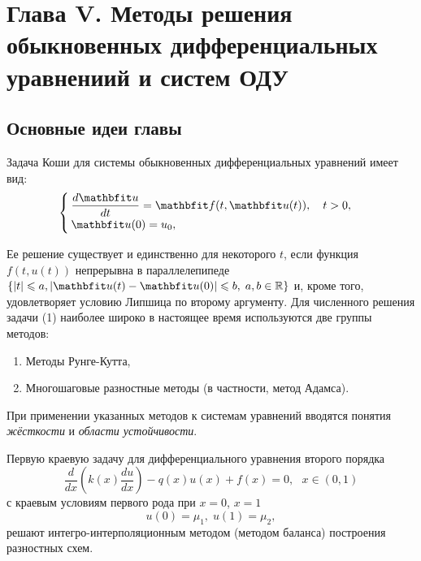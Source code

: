 \newpage
{}
\pagestyle{empty}
\vspace{0.5cm}

\section*{Глава V. Методы решения обыкновенных дифференциальных уравнениий и систем ОДУ}

\subsection{Основные идеи главы} 

Задача Коши для системы обыкновенных дифференциальных уравнений имеет вид:
\begin{equation}
%
    \label{Koshi_sys}
    \begin{cases}
        \dfrac{d\vfunc{u}}{dt} = \vfunc{f}(t, \vfunc{u}(t)), \quad t > 0, \\
        \vfunc{u}(0) = u_0,
    \end{cases}
\end{equation}

Ее решение существует и единственно для некоторого $t$, если функция $f(t, u(t))$ непрерывна в параллелепипеде $\{|t| \leqslant a, | \vfunc{u}(t)-\vfunc{u}(0)| \leqslant b,\; a, b\in\mathbb{R}\}$ и, кроме того, удовлетворяет условию Липшица по второму аргументу. Для численного решения задачи (1) наиболее широко в настоящее время используются две группы методов: 
\begin{enumerate}
\item Методы Рунге-Кутта,
\item Многошаговые разностные методы (в частности, метод Адамса).
\end{enumerate}

При применении указанных методов к системам уравнений вводятся понятия \textit{жёсткости} и \textit{области устойчивости}.
 
Первую краевую задачу для дифференциального уравнения второго порядка
\begin{equation}
    \label{eq:2-ord-eq}
    \dfrac{d}{dx}\left(k(x)\dfrac{du}{dx}\right) - q(x)u(x) + f(x) = 0, ~~~x\in(0,1)
\end{equation}
%
с краевым условиям первого рода при $x=0$, $x=1$
%
\begin{equation}
    \label{eq:2-ord-eq-bounds}
    u(0) = \mu_1,\;u(1) = \mu_2,
\end{equation}
%
решают интегро-интерполяционным методом (методом баланса) построения разностных схем.

